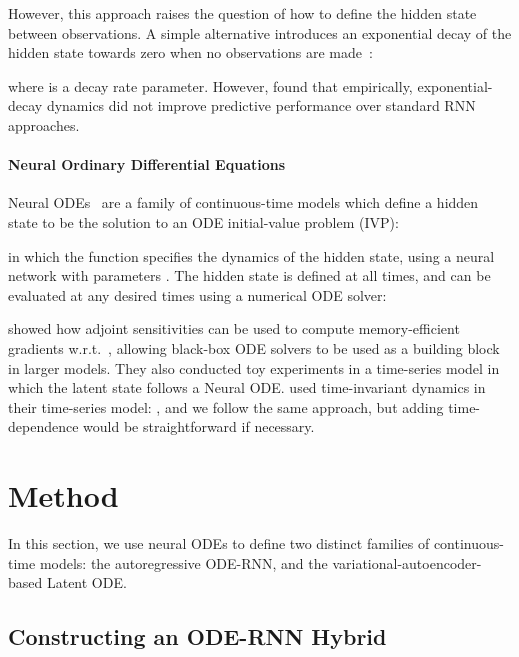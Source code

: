 \documentclass{article}
\begin{document}
However, this approach raises the question of how to define the hidden state  between observations.
A simple alternative introduces an exponential decay of the hidden state towards zero when no observations are made~\citep{che_sontag_2018, BRITS_2018, google_ehr_2018, mozer_2017}:

where  is a decay rate parameter.
However, \citet{mozer_2017} found that empirically, exponential-decay dynamics did not improve predictive performance over standard RNN approaches.

\paragraph{Neural Ordinary Differential Equations}Neural ODEs~\citep{NeuralODE} are a family of continuous-time models which define a hidden state  to be the solution to an ODE initial-value problem (IVP):

in which the function  specifies the dynamics of the hidden state, using a neural network with parameters . 
The hidden state  is defined at all times, and can be evaluated at any desired times using a numerical ODE solver:

\citet{NeuralODE} showed how adjoint sensitivities can be used to compute memory-efficient gradients w.r.t.\ , allowing black-box ODE solvers to be used as a building block in larger models.
They also conducted toy experiments in a time-series model in which the latent state follows a Neural ODE.
\citet{NeuralODE} used time-invariant dynamics in their time-series model: 
, and we follow the same approach, but adding time-dependence would be straightforward if necessary.








\section{Method}

In this section, we use neural ODEs to define two distinct families of continuous-time models: the autoregressive ODE-RNN, and the variational-autoencoder-based Latent ODE.

\subsection{Constructing an ODE-RNN Hybrid}
\end{document}
